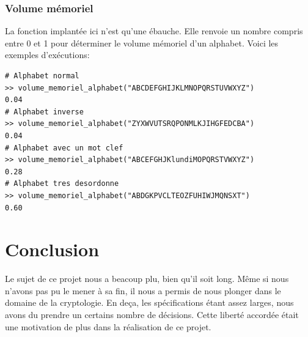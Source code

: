 \documentclass[a4paper, 11pt]{article}
\begin{document}
\subsubsection{Volume mémoriel}
La fonction implantée ici n'est qu'une ébauche. Elle renvoie un nombre
compris entre 0 et 1 pour déterminer le volume mémoriel d'un
alphabet. Voici les exemples d'exécutions:\\

\begin{lstlisting}
# Alphabet normal
>> volume_memoriel_alphabet("ABCDEFGHIJKLMNOPQRSTUVWXYZ")
0.04
# Alphabet inverse
>> volume_memoriel_alphabet("ZYXWVUTSRQPONMLKJIHGFEDCBA")
0.04
# Alphabet avec un mot clef
>> volume_memoriel_alphabet("ABCEFGHJKlundiMOPQRSTVWXYZ")
0.28
# Alphabet tres desordonne
>> volume_memoriel_alphabet("ABDGKPVCLTEOZFUHIWJMQNSXT") 
0.60  
\end{lstlisting}

\section{Conclusion}
Le sujet de ce projet nous a beacoup plu, bien qu'il soit long.
Même si nous n'avons pas pu le mener à sa fin, il nous a permis de nous
plonger dans le domaine de la cryptologie.
En deça, les spécifications étant assez larges, nous avons du prendre
un certains nombre de décisions. Cette liberté accordée était une motivation de plus dans la
réalisation de ce projet.
\end{document}
